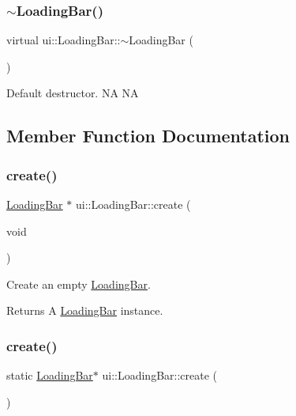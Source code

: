 \subsubsection{\texorpdfstring{$\sim$\+Loading\+Bar()}{~LoadingBar()}\hspace{0.1cm}{\footnotesize\ttfamily [2/2]}}
{\footnotesize\ttfamily virtual ui\+::\+Loading\+Bar\+::$\sim$\+Loading\+Bar (\begin{DoxyParamCaption}{ }\end{DoxyParamCaption})\hspace{0.3cm}{\ttfamily [virtual]}}

Default destructor.  NA  NA 

\subsection{Member Function Documentation}
\mbox{\label{classui_1_1LoadingBar_afb0fdd00a7d0a95c64daf25701f671da}} 
\subsubsection{\texorpdfstring{create()}{create()}\hspace{0.1cm}{\footnotesize\ttfamily [1/6]}}
{\footnotesize\ttfamily \hyperlink{classui_1_1LoadingBar}{Loading\+Bar} $\ast$ ui\+::\+Loading\+Bar\+::create (\begin{DoxyParamCaption}\item[{void}]{ }\end{DoxyParamCaption})\hspace{0.3cm}{\ttfamily [static]}}

Create an empty \hyperlink{classui_1_1LoadingBar}{Loading\+Bar}. \begin{DoxyReturn}{Returns}
A \hyperlink{classui_1_1LoadingBar}{Loading\+Bar} instance. 
\end{DoxyReturn}
\mbox{\label{classui_1_1LoadingBar_a6ecb712e35e109995a7a817432a447ae}} 
\subsubsection{\texorpdfstring{create()}{create()}\hspace{0.1cm}{\footnotesize\ttfamily [2/6]}}
{\footnotesize\ttfamily static \hyperlink{classui_1_1LoadingBar}{Loading\+Bar}$\ast$ ui\+::\+Loading\+Bar\+::create (\begin{DoxyParamCaption}{ }\end{DoxyParamCaption})\hspace{0.3cm}{\ttfamily [static]}}

